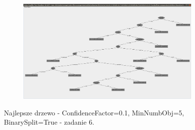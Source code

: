 \documentclass[12pt]{article}
\begin{document}
\clearpage
\begin{figure}[h!]
	\centering
	\begin{subfigure}[b]{1\linewidth}
		\includegraphics[width=\linewidth]{Drzewo_port.png}
	\end{subfigure}
	\label{fig:Chosen}
	\caption{Najlepsze drzewo - ConfidenceFactor=0.1, MinNumbObj=5, BinarySplit=True - zadanie 6.}
\end{figure}
\clearpage
\end{document}
